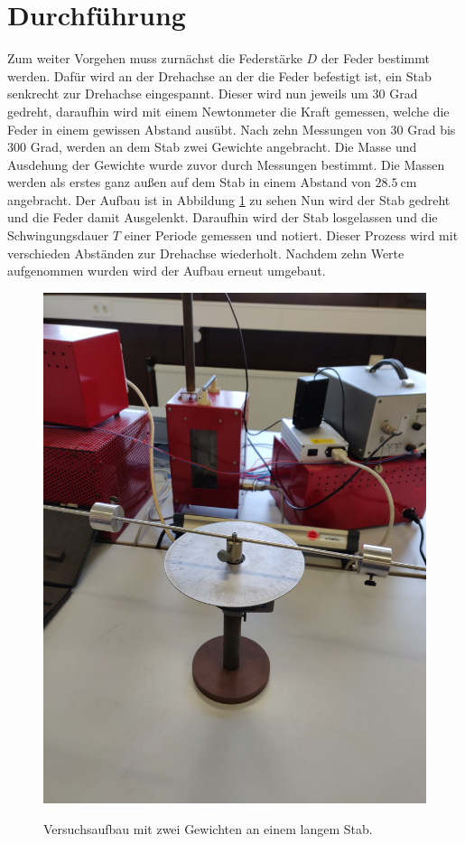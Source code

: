 \section{Durchführung}
\label{sec:Durchführung}

Zum weiter Vorgehen muss zurnächst die Federstärke $D$ der Feder bestimmt werden.
Dafür wird an der Drehachse an der die Feder befestigt ist, ein Stab senkrecht zur Drehachse eingespannt.
Dieser wird nun jeweils um 30 Grad gedreht, daraufhin wird mit einem Newtonmeter die Kraft gemessen, welche die Feder in einem gewissen Abstand ausübt.
Nach zehn Messungen von 30 Grad bis 300 Grad, werden an dem Stab zwei Gewichte angebracht.
Die Masse und Ausdehung der Gewichte wurde zuvor durch Messungen bestimmt.
Die Massen werden als erstes ganz außen auf dem Stab in einem Abstand von $\SI{28.5}{\centi\meter}$ angebracht.
Der Aufbau ist in Abbildung \ref{fig:StabmitGewicht} zu sehen
Nun wird der Stab gedreht und die Feder damit Ausgelenkt.
Daraufhin wird der Stab losgelassen und die Schwingungsdauer $T$ einer Periode gemessen und notiert.
Dieser Prozess wird mit verschieden Abständen zur Drehachse wiederholt.
Nachdem zehn Werte aufgenommen wurden wird der Aufbau erneut umgebaut.

\begin{figure}
\centering
\caption{Versuchsaufbau mit zwei Gewichten an einem langem Stab.}
\includegraphics[scale=0.1]{content/data/StabmitGewichten.png}
\label{fig:StabmitGewicht}
\end{figure}

